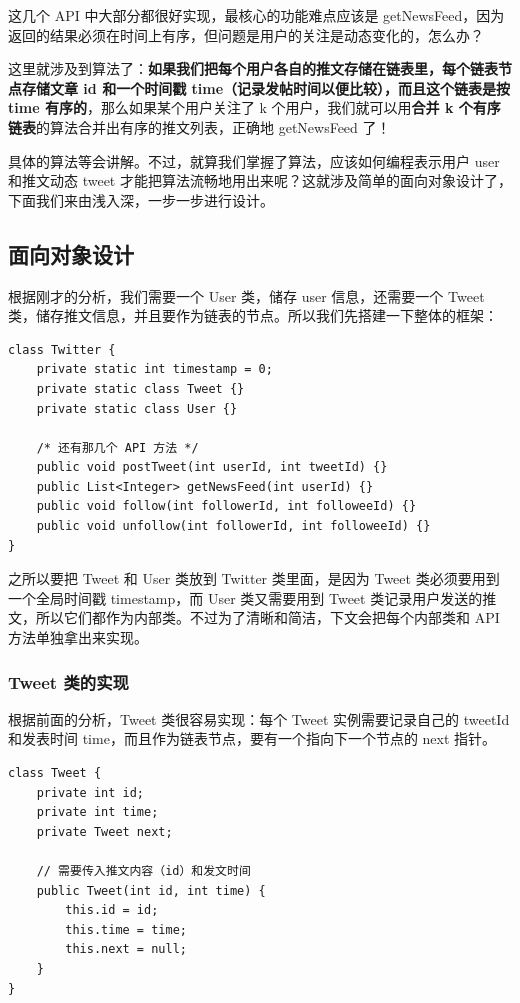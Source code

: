 \documentclass[12pt]{article}
\begin{document}
这几个 API 中大部分都很好实现，最核心的功能难点应该是 getNewsFeed，因为返回的结果必须在时间上有序，但问题是用户的关注是动态变化的，怎么办？

这里就涉及到算法了：\textbf{如果我们把每个用户各自的推文存储在链表里，每个链表节点存储文章 id 和一个时间戳 time（记录发帖时间以便比较），而且这个链表是按 time 有序的}，那么如果某个用户关注了 k 个用户，我们就可以用\textbf{合并 k 个有序链表}的算法合并出有序的推文列表，正确地 getNewsFeed 了！

具体的算法等会讲解。不过，就算我们掌握了算法，应该如何编程表示用户 user 和推文动态 tweet 才能把算法流畅地用出来呢？这就涉及简单的面向对象设计了，下面我们来由浅入深，一步一步进行设计。

\subsection{面向对象设计}
根据刚才的分析，我们需要一个 User 类，储存 user 信息，还需要一个 Tweet 类，储存推文信息，并且要作为链表的节点。所以我们先搭建一下整体的框架：
\begin{lstlisting}
class Twitter {
    private static int timestamp = 0;
    private static class Tweet {}
    private static class User {}

    /* 还有那几个 API 方法 */
    public void postTweet(int userId, int tweetId) {}
    public List<Integer> getNewsFeed(int userId) {}
    public void follow(int followerId, int followeeId) {}
    public void unfollow(int followerId, int followeeId) {}
}
\end{lstlisting}
之所以要把 Tweet 和 User 类放到 Twitter 类里面，是因为 Tweet 类必须要用到一个全局时间戳 timestamp，而 User 类又需要用到 Tweet 类记录用户发送的推文，所以它们都作为内部类。不过为了清晰和简洁，下文会把每个内部类和 API 方法单独拿出来实现。

\subsubsection{Tweet 类的实现}
根据前面的分析，Tweet 类很容易实现：每个 Tweet 实例需要记录自己的 tweetId 和发表时间 time，而且作为链表节点，要有一个指向下一个节点的 next 指针。
\begin{lstlisting}
class Tweet {
    private int id;
    private int time;
    private Tweet next;

    // 需要传入推文内容（id）和发文时间
    public Tweet(int id, int time) {
        this.id = id;
        this.time = time;
        this.next = null;
    }
}
\end{lstlisting}
\end{document}

